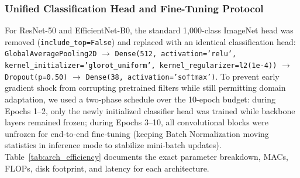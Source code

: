 \documentclass[journal]{IEEEtran}
\begin{document}
\subsubsection{Unified Classification Head and Fine-Tuning Protocol}
For ResNet-50 and EfficientNet-B0, the standard 1,000-class ImageNet head was removed (\texttt{include\_top=False}) and replaced with an identical classification head: \texttt{GlobalAveragePooling2D} $\to$ \texttt{Dense(512, activation='relu', kernel\_initializer='glorot\_uniform', kernel\_regularizer=l2(1e-4))} $\to$ \texttt{Dropout(p=0.50)} $\to$ \texttt{Dense(38, activation='softmax')}. To prevent early gradient shock from corrupting pretrained filters while still permitting domain adaptation, we used a two-phase schedule over the 10-epoch budget: during Epochs 1--2, only the newly initialized classifier head was trained while backbone layers remained frozen; during Epochs 3--10, all convolutional blocks were unfrozen for end-to-end fine-tuning (keeping Batch Normalization moving statistics in inference mode to stabilize mini-batch updates). Table~\ref{tab:arch_efficiency} documents the exact parameter breakdown, MACs, FLOPs, disk footprint, and latency for each architecture.
\end{document}
